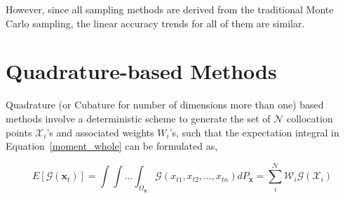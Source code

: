 
\begin{table}[H]
\begin{center}
\caption{List of some standard UQ methods}
\end{center}
\end{table}

However, since all sampling methods are derived from the traditional Monte Carlo sampling, the linear accuracy trends for all of them are similar. 

\section{Quadrature-based Methods}

Quadrature (or Cubature for number of dimensions more than one) based methods involve a deterministic scheme to generate the set of $\mathcal{N}$ collocation points $\mathcal{X}_i$'s and associated weights $W_i$'s, such that the expectation integral in Equation~\ref{moment_whole} can be formulated as,

\begin{equation}
\label{quad_int}
E[\mathcal{G}(\textbf{x}_t)] = \int \int \ldots \int_{\Omega_{\textbf{x}}} \mathcal{G}(x_{t1},x_{t2},\ldots,x_{tn}) dP_{\textbf{x}} =  \sum_i^{\mathcal{N}} \mathcal{W}_i \mathcal{G}(\mathcal{X}_i)
\end{equation}

